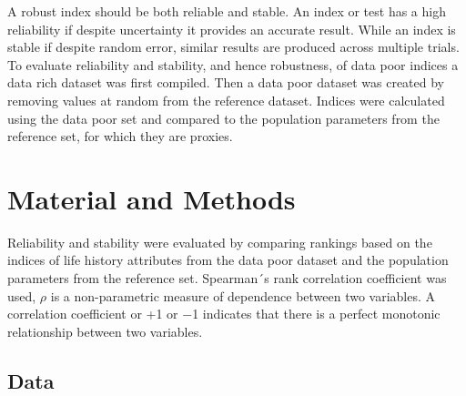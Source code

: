 \documentclass[12pt,doublespacing,a4paper]{ouparticle}
\begin{document}

A robust index should be both reliable and stable. An index or test has a high reliability if despite uncertainty it provides an accurate result. While an index is stable if despite random error, similar results are produced across multiple trials. To evaluate reliability and stability, and hence robustness, of data poor indices a data rich dataset was first compiled. Then a data poor dataset was created by removing values at random from the reference dataset. Indices were calculated using the data poor set and compared to the population parameters from the reference set, for which they are proxies. 

\section{Material and Methods}

Reliability and stability were evaluated by comparing rankings based on the indices of life history attributes from the data poor dataset and the population parameters from the reference set.  Spearman´s rank correlation coefficient \citep[$\rho$][]{spearman1904general} was used, $\rho$ is a non-parametric measure of dependence between two variables. A correlation coefficient or +1 or −1 indicates that there is a perfect monotonic relationship between two variables. 

\subsection{Data}
\end{document}

